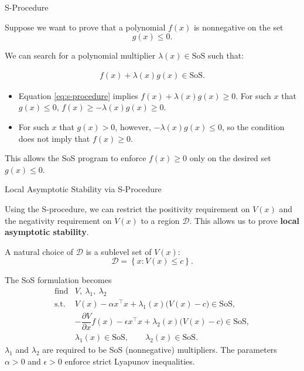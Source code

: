 \documentclass{beamer}
\begin{document}
\begin{frame}{S-Procedure}
	\begin{flushleft}
		Suppose we want to prove that a polynomial $f(x)$ is
		nonnegative on the set
		\[
		g(x)\leq0.
		\]
		
		We can search for a polynomial multiplier
		$\lambda(x)\in\mathrm{SoS}$ such that:
		
		\begin{align}
			\label{eq:s-procedure}
			f(x)+\lambda(x)g(x)\in\mathrm{SoS}.
		\end{align}
		
		
		\begin{itemize}
			\item Equation \eqref{eq:s-procedure} implies $
			f(x)+\lambda(x)g(x)\geq0$. For such $x$ that $g(x)\leq0$, $f(x)
			\geq
			-\lambda(x)g(x)
			\geq0.$
			
			\item For such $x$ that $g(x)>0$, however, $-\lambda(x)g(x)\leq0$, 
			so the condition does not imply that $f(x)\geq0$.
		\end{itemize}
		
		
		\bigskip
		
		This allows the SoS program to enforce $f(x)\geq0$
		only on the desired set $g(x)\leq0$.
	\end{flushleft}
\end{frame}




\begin{frame}{Local Asymptotic Stability via S-Procedure}
	\begin{flushleft}
		Using the S-procedure, we can restrict the positivity
		requirement on $V(x)$ and the negativity requirement on
		$\dot V(x)$ to a region $\mathcal{D}$. This allows us to prove \textbf{local asymptotic stability}.
		
		\bigskip
		
		A natural choice of $\mathcal{D}$ is a sublevel set of $V(x)$:
		\[
		\mathcal{D}
		=
		\left\{
		x:V(x)\leq c
		\right\}.
		\]
		
		\bigskip
		
		The SoS formulation becomes
		\[
		\begin{array}{ll}
			\text{find} &
			V,\ \lambda_1,\ \lambda_2
			\\[0.2em]
			\text{s.t.}
			&
			V(x)-\alpha x^\top x
			+\lambda_1(x)\bigl(V(x)-c\bigr)
			\in\mathrm{SoS},
			\\[0.4em]
			&
			-\dfrac{\partial V}{\partial x}f(x)
			-\epsilon x^\top x
			+\lambda_2(x)\bigl(V(x)-c\bigr)
			\in\mathrm{SoS},
			\\[0.4em]
			&
			\lambda_1(x)\in\mathrm{SoS},
			\qquad
			\lambda_2(x)\in\mathrm{SoS}.
		\end{array}
		\]
		{\small
		$\lambda_1$ and $\lambda_2$ are required to be SoS
		(nonnegative) multipliers. The parameters $\alpha>0$
		and $\epsilon>0$ enforce strict Lyapunov inequalities.}
	\end{flushleft}
\end{frame}
\end{document}
